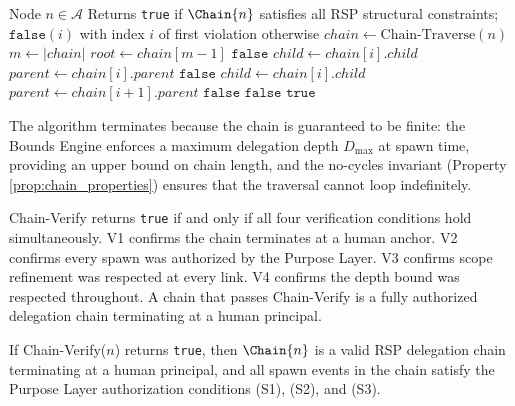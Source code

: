 \begin{algorithm}[htbp]
\caption{Chain-Verify($n$)}
\label{alg:chain_verify}
\begin{algorithmic}[1]
\Require Node $n \in \mathcal{A}$
\Ensure Returns \texttt{true} if $\Chain{n}$ satisfies all RSP structural constraints; $\texttt{false}(i)$ with index $i$ of first violation otherwise
\State $chain \gets \text{Chain-Traverse}(n)$
\State $m \gets |chain|$
\Statex
{}
\State $root \gets chain[m-1]$
    \State \Return $\texttt{false}$ 
\EndIf
\Statex
{}
    \State $child \leftarrow chain[i].child$
    \State $parent \leftarrow chain[i].parent$
        \State \Return $\texttt{false}$ 
    \EndIf
\EndFor
\Statex
{}
    \State $child \leftarrow chain[i].child$
    \State $parent \leftarrow chain[i+1].parent$
        \State \Return $\texttt{false}$ 
    \EndIf
\EndFor
\Statex
{}
        \State \Return $\texttt{false}$ 
    \EndIf
\EndFor
\State \Return $\texttt{true}$
\end{algorithmic}
\end{algorithm}

The algorithm terminates because the chain is guaranteed to be finite: the Bounds Engine enforces a maximum delegation depth $D_{\max}$ at spawn time, providing an upper bound on chain length, and the no-cycles invariant (Property \ref{prop:chain_properties}) ensures that the traversal cannot loop indefinitely.

Chain-Verify returns \texttt{true} if and only if all four verification conditions hold simultaneously. V1 confirms the chain terminates at a human anchor. V2 confirms every spawn was authorized by the Purpose Layer. V3 confirms scope refinement was respected at every link. V4 confirms the depth bound was respected throughout. A chain that passes Chain-Verify is a fully authorized delegation chain terminating at a human principal.

\begin{prop}
\label{prop:chain_verify_soundness}
If Chain-Verify($n$) returns \texttt{true}, then $\Chain{n}$ is a valid RSP delegation chain terminating at a human principal, and all spawn events in the chain satisfy the Purpose Layer authorization conditions (S1), (S2), and (S3).
\end{prop}


